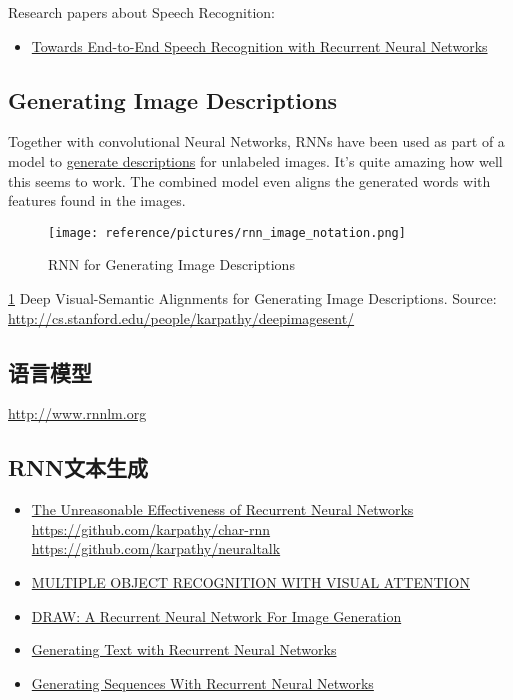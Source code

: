 \documentclass[UTF8,10pt,a4paper]{ctexbook}
\begin{document}
Research papers about Speech Recognition:
\begin{itemize}
\item \href{http://www.jmlr.org/proceedings/papers/v32/graves14.pdf}{Towards End-to-End Speech Recognition with Recurrent Neural Networks}
\end{itemize}


\subsection{Generating Image Descriptions}
Together with convolutional Neural Networks, RNNs have been used as part of a model to \href{http://cs.stanford.edu/people/karpathy/deepimagesent/}{generate descriptions} for unlabeled images. It's quite amazing how well this seems to work. The combined model even aligns the generated words with features found in the images.

\begin{figure}[ht]
    \centering
    \texttt{[image: reference/pictures/rnn\_image\_notation.png]}
    \caption{RNN for Generating Image Descriptions}
    \label{fig:rnn_image_notation}
\end{figure}
\ref{fig:rnn_image_notation}
Deep Visual-Semantic Alignments for Generating Image Descriptions.
Source: \url{http://cs.stanford.edu/people/karpathy/deepimagesent/}


\subsection{语言模型}
\href{Mikolov et al.}{http://www.rnnlm.org}

\subsection{RNN文本生成}
\begin{itemize}
\item \href{http://karpathy.github.io/2015/05/21/rnn-effectiveness/}{The Unreasonable Effectiveness of Recurrent Neural Networks}
\subitem \url{https://github.com/karpathy/char-rnn}
\subitem \url{https://github.com/karpathy/neuraltalk}
\item \href{https://arxiv.org/abs/1412.7755}{MULTIPLE OBJECT RECOGNITION WITH VISUAL ATTENTION}
\item \href{https://arxiv.org/abs/1502.04623}{DRAW: A Recurrent Neural Network For Image Generation}
\item \href{http://www.cs.utoronto.ca/~ilya/pubs/2011/LANG-RNN.pdf}{Generating Text with Recurrent Neural Networks}
\item \href{https://arxiv.org/abs/1308.0850}{Generating Sequences With Recurrent Neural Networks}
\end{itemize}
\end{document}
